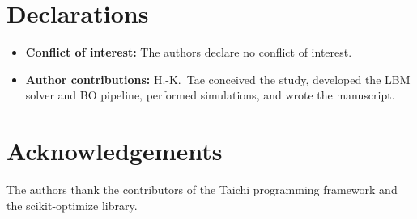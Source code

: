 \documentclass[12pt,a4paper]{article}
\begin{document}
\section*{Declarations}

\begin{itemize}
\item \textbf{Conflict of interest:} The authors declare no conflict of interest.
\item \textbf{Author contributions:} H.-K.\ Tae conceived the study, developed
  the LBM solver and BO pipeline, performed simulations, and wrote the manuscript.
\end{itemize}

\section*{Acknowledgements}
The authors thank the contributors of the Taichi programming framework
and the scikit-optimize library.



\end{document}
